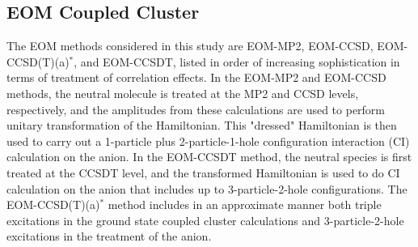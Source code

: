 \subsection{EOM Coupled Cluster}
\label{sub:EOM}
The EOM methods considered in this study are EOM-MP2,\cite{EOMMP2} EOM-CCSD,\cite{EOMCCSD} EOM-CCSD(T)(a)$^*$,\cite{EOMCCSDpTASTAR} and EOM-CCSDT,\cite{EOMCCSDT1,EOMCCSDT2} listed in order of increasing sophistication in terms of treatment of correlation effects. 
In the EOM-MP2 and EOM-CCSD methods, the neutral molecule is treated at the MP2 and CCSD levels, respectively, and the amplitudes from these calculations are used to perform unitary transformation of the Hamiltonian.
This "dressed" Hamiltonian is then used to carry out a 1-particle plus 2-particle-1-hole configuration interaction (CI) calculation on the anion.
In the EOM-CCSDT method, the neutral species is first treated at the CCSDT level, and the transformed Hamiltonian is used to do CI calculation on the anion that includes up to 3-particle-2-hole configurations.
The EOM-CCSD(T)(a)$^*$ method includes in an approximate manner both triple excitations in the ground state coupled cluster calculations and 3-particle-2-hole excitations in the treatment of the anion.\cite{EOMCCSDpTASTAR}

